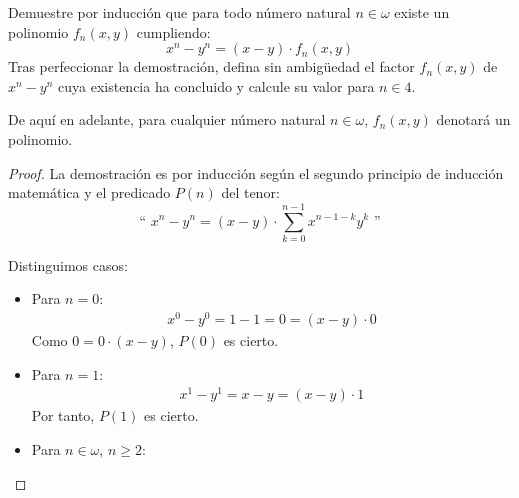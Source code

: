 \documentclass[12pt]{article}
\begin{document}
    \begin{ejercicio}[Inducción]
        Demuestre por inducción que para todo número natural $n\in\omega$ existe un polinomio $f_n(x, y)$ cumpliendo:
        \begin{equation*}
            x^n - y^n = (x-y)\cdot f_n(x, y)
        \end{equation*}
        Tras perfeccionar la demostración, defina sin ambigüedad el factor $f_n(x, y)$ de $x^n - y^n$ cuya existencia ha concluido y calcule su valor para $n\in 4$.

        \begin{notacion}
            De aquí en adelante, para cualquier número natural $n\in\omega$, $f_n(x, y)$ denotará un polinomio.
        \end{notacion}
        \begin{proof}
            La demostración es por inducción según el segundo principio de inducción matemática y el predicado $P(n)$ del tenor:
            \begin{equation*}
                \text{`` }x^n - y^n = (x-y)\cdot \sum_{k=0}^{n-1}x^{n-1-k}y^k\text{ ''}
            \end{equation*}
            
            Distinguimos casos:
            \begin{itemize}
                \item Para $n=0$:
                    \begin{align*}
                        x^0 - y^0 = 1 - 1 = 0 = (x-y)\cdot 0
                    \end{align*}
                    Como $0 = 0\cdot (x-y)$, $P(0)$ es cierto.

                \item Para $n=1$:
                    \begin{align*}
                        x^1 - y^1 = x - y = (x-y)\cdot 1
                    \end{align*}
                    Por tanto, $P(1)$ es cierto.
    
                \item Para $n\in \omega$, $n\geq 2$:
                

\end{itemize}
\end{proof}
\end{ejercicio}
\end{document}
